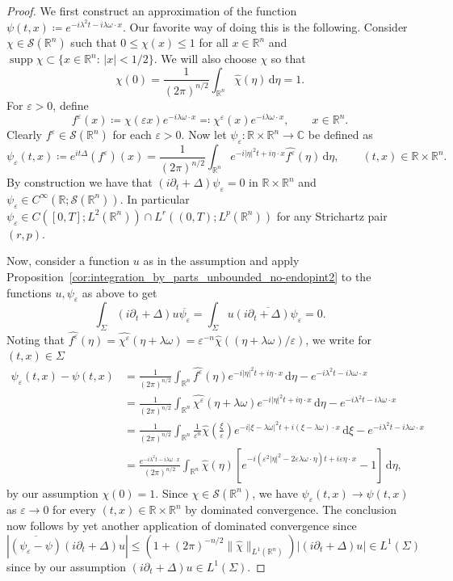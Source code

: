 \documentclass[11pt,a4paper]{amsart}
\theoremstyle{remark}
\theoremstyle{definition}
\DeclareMathOperator{\supp}{supp}
\newcommand{\R}{\mathbb{R}}
\newcommand{\C}{\mathbb{C}}
\newcommand{\dd}{\mathrm{d}}
\def\ve{\varepsilon}
\def\ovl{\overline}
\begin{document}
\begin{proof} We first construct an approximation of the function $\psi(t,x)\coloneqq e^{  -i \lambda^2 t - i\lambda \omega \cdot x }$. Our favorite way of doing this is the following. Consider $\chi \in \mathcal S (\R^n)$ such that $0 \leq \chi (x) \leq 1$ for all $x \in \R^n$ and $\supp \chi \subset \{ x \in \R^n : \, |x| < 1/2 \}$. We will also choose $\chi$ so that 
\[
\chi(0)=\frac{1}{(2\pi)^{n/2}}\int_{\R^n} \widehat{\chi}(\eta)\,\dd \eta=1.
\]
For $\varepsilon > 0$, define
\[ 
f^\ve (x) \coloneqq \chi(\ve x) e^{-i \lambda \omega \cdot x}\eqqcolon \chi^\ve (x) e^{-i \lambda \omega \cdot x}, \qquad  x \in \R^n. 
\]
Clearly $f^\ve \in \mathcal S(\R^n)$ for each $\ve>0$. Now let $\psi_\ve: \R\times \R^n\to \C$ be defined as 
\[
\psi_\ve (t,x)\coloneqq e^{it\Delta}(f^\ve)(x)=\frac{1}{(2\pi)^{n/2}}\int_{\R^n} e^{-i|\eta|^2t + i \eta\cdot x} \widehat{f^\ve}(\eta)\, \dd \eta,\qquad (t,x)\in \R\times \R^n.
\]
By construction we have that $(i\partial_t+\Delta)\psi_\ve=0$ in $\R\times \R^n$ and $\psi_\ve \in C^\infty(\R;\mathcal S(\R^n))$. In particular $\psi_\ve\in C([0,T];L^2(\R^n))\cap L^{r}((0,T);L^p(\R^n))$ for any Strichartz pair $(r,p)$. 

Now, consider a function $u$ as in the assumption and apply Proposition~\ref{cor:integration_by_parts_unbounded_no-endopint2} to the functions $u,\psi_\ve$ as above to get
\[
 \int_{\Sigma}  \left(i\partial_t+\Delta\right)u  \ovl{\psi_\ve} = \int_{\Sigma} u  \ovl{\left(i\partial_t+\Delta\right)\psi_\ve}  = 0.     
\]
Noting that $\widehat {f^\ve}(\eta)=\widehat{\chi^\ve}(\eta+\lambda \omega)=\ve^{-n}\widehat{\chi}((\eta+\lambda\omega)/\ve)$, we write for $(t,x)\in \Sigma$
\[
\begin{split}
\psi_\ve (t,x)-\psi(t,x)& = \frac{1}{(2\pi)^{n/2}}\int_{\R^n} \widehat{f^\ve}(\eta) e^{-i|\eta|^2t + i\eta\cdot x}\, \dd \eta - e^{-i\lambda^2 t - i\lambda\omega\cdot x}
\\
&= \frac{1}{(2\pi)^{n/2}}\int_{\R^n}\widehat{\chi^\ve}(\eta+\lambda\omega) e^{-i|\eta|^2t+i\eta\cdot x}\, \dd \eta - e^{-i\lambda^2 t -i\lambda\omega\cdot x}
\\
&= \frac{1}{(2\pi)^{n/2}}\int_{\R^n}\frac{1}{\ve^n}\widehat{\chi}\left(\frac{\xi}{\ve}\right) e^{-i|\xi-\lambda\omega|^2t +i(\xi-\lambda\omega)\cdot x}\, \dd \xi - e^{-i\lambda^2 t - i\lambda\omega\cdot x}
\\
&=\frac{e^{-i\lambda^2 t - i\lambda\omega\cdot x}}{(2\pi)^{n/2}}
\int_{\R^n} \widehat{\chi }(\eta ) \left[e^{-i\left(\ve^2|\eta|^2-2\ve \lambda \omega\cdot \eta\right)t + i\ve\eta\cdot x} - 1\right]\, \dd \eta ,
\end{split}
\]
by our assumption $\chi(0)=1$. Since $\chi\in\mathcal S(\R^n)$, we have $\psi_\ve(t,x)\to \psi(t,x)$ as $\ve \to 0$ for every $(t,x)\in \R\times\R^n$ by dominated convergence. The conclusion now follows by yet another application of dominated convergence since
\[
\left| \ovl{(\psi_\ve-\psi)}{\left(i\partial_t+\Delta\right)u}\right|\leq \left(1+(2\pi)^{-n/2}\| \widehat{\chi} \|_{L^1(\R^n)}\right)\left|\left(i\partial_t+\Delta\right)u\right|\in L^1(\Sigma)
\]
since by our assumption $(i\partial_t+\Delta)u\in L^1(\Sigma)$.
\end{proof}
\end{document}
